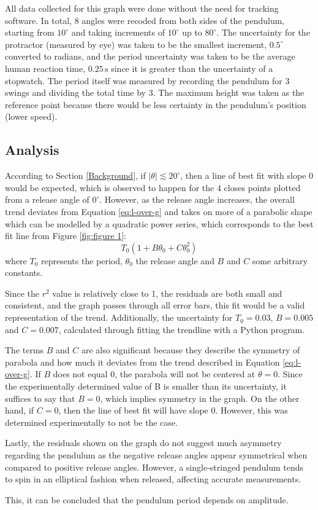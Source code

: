 \documentclass[12pt]{article}
\begin{document}
All data collected for this graph were done without the need for tracking software. {\color{blue}In total, 8 angles were recoded from both sides of the pendulum, starting from $10^\circ$ and taking increments of $10^\circ$ up to $80^\circ$}. The uncertainty for the protractor (measured by eye) was taken to be the smallest increment, $0.5^{\circ}$ converted to radians, and the period uncertainty was taken to be the average human reaction time, $0.25\,\text{s}$ \cite{reaction-time} {\color{blue} since it is greater than the uncertainty of a stopwatch. The period itself was measured by recording the pendulum for 3 swings and dividing the total time by 3. The maximum height was taken as the reference point because there would be less certainty in the pendulum's position (lower speed).}

\subsection{Analysis}
According to Section \ref{Background}, {\color{blue} if $|\theta| \lesssim 20^{\circ}$, then a line of best fit with slope 0 would be expected, which is observed to happen for the 4 closes points plotted from a release angle of $0^\circ$. However, as the release angle increases, the overall trend deviates from Equation \ref{eq:l-over-g} and takes on more of a parabolic shape which can be modelled by a quadratic power series, which corresponds to the best fit line from Figure \ref{fig:figure 1}:}
\begin{equation} \label{eq:power series}
    T_0(1 + B\theta_0 + C\theta_0^2)
\end{equation}
where $T_0$ represents the period, $\theta_0$ the release angle and $B$ and $C$ some arbitrary constants. {\color{blue}Since the $r^2$ value is relatively close to 1, the residuals are both small and consistent, and the graph passes through all error bars, this fit would be a valid representation of the trend. Additionally, the uncertainty for $T_0 = 0.03$, $B = 0.005$ and $C = 0.007$, calculated through fitting the trendline with a Python program.

The terms $B$ and $C$ are also significant because they describe the symmetry of parabola and how much it deviates from the trend described in Equation \ref{eq:l-over-g}. If $B$ does not equal 0, the parabola will not be centered at $\theta = 0$. Since the experimentally determined value of B is smaller than its uncertainty, it suffices to say that $B = 0$, which implies symmetry in the graph. On the other hand, if $C = 0$, then the line of best fit will have slope 0. However, this was determined experimentally to not be the case.


Lastly, the residuals shown on the graph do not suggest much asymmetry regarding the pendulum as the negative release angles appear symmetrical when compared to positive release angles. However, a single-stringed pendulum tends to spin in an elliptical fashion when released, affecting accurate measurements.

This, it can be concluded that the pendulum period depends on amplitude.}
\end{document}
